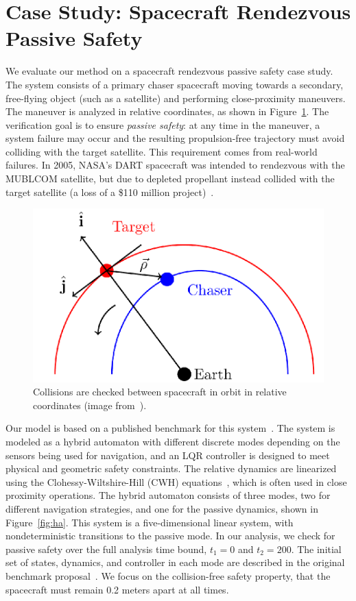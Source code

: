 \section{Case Study: Spacecraft Rendezvous Passive Safety}
\label{sec:casestudy}

We evaluate our method on a spacecraft rendezvous passive safety case study. The system consists of a primary chaser spacecraft moving towards a secondary, free-flying object (such as a satellite) and performing close-proximity maneuvers.
%
The maneuver is analyzed in relative coordinates, as shown in Figure~\ref{fig:chaser}.
%
The verification goal is to ensure \emph{passive safety}: at any time in the maneuver, a system failure may occur and the resulting propulsion-free trajectory must avoid colliding with the target satellite.
%
This requirement comes from real-world failures. In 2005, NASA’s DART spacecraft was intended to rendezvous with the MUBLCOM satellite, but due to depleted propellant instead collided with the target satellite (a loss of a
\$110 million project)~\cite{croomes2006overview}.

\begin{figure}[t]
\centerline{\includegraphics[width=0.5\columnwidth]{images/chaser.png}}
\caption{Collisions are checked between spacecraft in orbit in relative coordinates (image from~\cite{chan2017verifying}).}
\label{fig:chaser}
\end{figure}

Our model is based on a published benchmark for this system~\cite{chan2017verifying,jewison2016spacecraft}. The system is modeled as a hybrid automaton with different discrete modes depending on the sensors being used for navigation, and an LQR controller is designed to meet physical and geometric safety constraints.
%
The relative dynamics are linearized using the Clohessy-Wiltshire-Hill (CWH) equations~\cite{wh1960terminal}, which is often used in close proximity operations. The hybrid automaton consists of three modes, two for different navigation strategies, and one for the passive dynamics, shown in Figure~\ref{fig:ha}.
%
This system is a five-dimensional linear system, with nondeterministic transitions to the passive mode.
%
In our analysis, we check for passive safety over the full analysis time bound, $t_1=0$ and $t_2=200$.
%
The initial set of states, dynamics, and controller in each mode are described in the original benchmark proposal~\cite{chan2017verifying}.
%
We focus on the collision-free safety property, that the spacecraft must remain 0.2 meters apart at all times.

